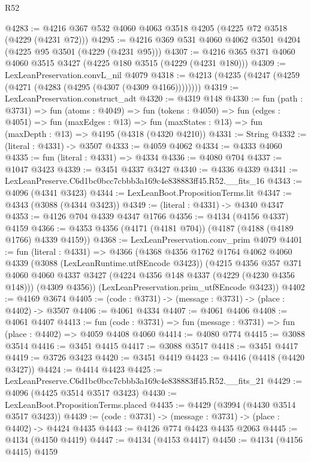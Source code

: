 \begin{lexlean}{R52}
\begin{coremodule}
@4283 := @4216 @367 @532 @4060 @4063 @3518 @4205 (@4225 @72 @3518 (@4229 (@4231 @72)))
@4295 := @4216 @369 @531 @4060 @4062 @3501 @4204 (@4225 @95 @3501 (@4229 (@4231 @95)))
@4307 := @4216 @365 @371 @4060 @4060 @3515 @3427 (@4225 @180 @3515 (@4229 (@4231 @180)))
@4309 := LexLeanPreservation.convL_nil @4079
@4318 := @4213 (@4235 (@4247 (@4259 (@4271 (@4283 (@4295 (@4307 (@4309 @4166))))))))
@4319 := LexLeanPreservation.construct_adt
@4320 := @4319 @148
@4330 := fun (path : @3731) =>
  fun (atoms : @4049) =>
  fun (tokens : @4050) =>
  fun (edges : @4051) =>
  fun (maxEdges : @13) =>
  fun (maxStates : @13) => fun (maxDepth : @13) => @4195 (@4318 (@4320 @4210))
@4331 := String
@4332 := (literal : @4331) -> @3507
@4333 := @4059 @4062
@4334 := @4333 @4060
@4335 := fun (literal : @4331) => @4334
@4336 := @4080 @704
@4337 := @1047 @3423
@4339 := @3451 @4337 @3427
@4340 := @4336 @4339
@4341 := LexLeanPreserve.C6d1bc0bcc7cbbb3a169c4e838883ff45.R52.__fits_16
@4343 := @4096 (@4341 @3423)
@4344 := LexLeanBoot.PropositionTerms.lit
@4347 := @4343 (@3088 (@4344 @3423))
@4349 := (literal : @4331) -> @4340 @4347
@4353 := @4126 @704 @4339 @4347 @1766
@4356 := @4134 (@4156 @4337) @4159
@4366 := @4353 @4356 (@4171 (@4181 @704)) (@4187 (@4188 (@4189 @1766) @4339 @4159))
@4368 := LexLeanPreservation.conv_prim @4079
@4401 := fun (literal : @4331) =>
  @4366
    (@4368
      @4356
      @1762
      @1764
      @4062
      @4060
      @4339
      (@3088 (LexLeanRuntime.utf8Encode @3423))
      (@4215
        @4356
        @357
        @371
        @4060
        @4060
        @4337
        @3427
        (@4224 @4356 @148 @4337 (@4229 (@4230 @4356 @148)))
        (@4309 @4356))
      (LexLeanPreservation.prim_utf8Encode @3423))
@4402 := @4169 @3674
@4405 := (code : @3731) -> (message : @3731) -> (place : @4402) -> @3507
@4406 := @4061 @4334
@4407 := @4061 @4406
@4408 := @4061 @4407
@4413 := fun (code : @3731) => fun (message : @3731) => fun (place : @4402) => @4059 @4408 @4060
@4414 := @4080 @774
@4415 := @3088 @3514
@4416 := @3451 @4415
@4417 := @3088 @3517
@4418 := @3451 @4417
@4419 := @3726 @3423
@4420 := @3451 @4419
@4423 := @4416 (@4418 (@4420 @3427))
@4424 := @4414 @4423
@4425 := LexLeanPreserve.C6d1bc0bcc7cbbb3a169c4e838883ff45.R52.__fits_21
@4429 := @4096 (@4425 @3514 @3517 @3423)
@4430 := LexLeanBoot.PropositionTerms.placed
@4435 := @4429 (@3994 (@4430 @3514 @3517 @3423))
@4439 := (code : @3731) -> (message : @3731) -> (place : @4402) -> @4424 @4435
@4443 := @4126 @774 @4423 @4435 @2063
@4445 := @4134 (@4150 @4419)
@4447 := @4134 (@4153 @4417)
@4450 := @4134 (@4156 @4415) @4159

\end{coremodule}
\end{lexlean}
